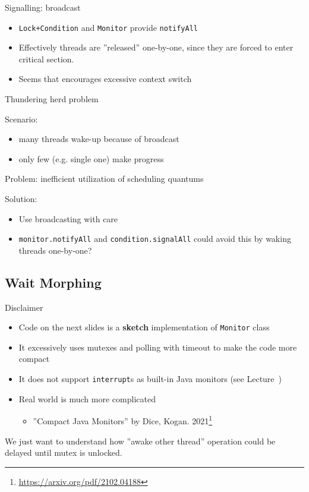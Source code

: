 \begin{frame}[t,noframenumbering]{Signalling: broadcast}

\begin{itemize}
    \item \texttt{Lock+Condition} and \texttt{Monitor} provide \texttt{notifyAll}
    \item Effectively threads are ''released'' one-by-one, since they are forced to enter critical section.    
    \pause \item Seems that encourages excessive context switch
\end{itemize}
\end{frame}

\begin{frame}[fragile]{Thundering herd problem}

    Scenario:
    \begin{itemize}
        \item many threads wake-up because of broadcast 
        \item only few (e.g. single one) make progress
    \end{itemize}

    \pause
    Problem: inefficient utilization of scheduling quantums

    \pause

    Solution:
    \begin{itemize}
        \item Use broadcasting with care
        \pause \item \texttt{monitor.notifyAll} and \texttt{condition.signalAll} could avoid this by waking threads one-by-one?
    \end{itemize}
\end{frame}

\subsection{Wait Morphing}
\showTOCSub

\begin{frame}[t,fragile]{Disclaimer}

\begin{itemize}
    \item Code on the next slides is a \textbf{sketch} implementation of \texttt{Monitor} class
    \item It excessively uses mutexes and polling with timeout to make the code more compact
    \item It does not support \texttt{interrupt}s as built-in Java monitors (see Lecture~\patternsNum)
    \item Real world is much more complicated
    \begin{itemize}
        \item ''Compact Java Monitors'' by Dice, Kogan. 2021\footnote{\tiny\url{https://arxiv.org/pdf/2102.04188}}
    \end{itemize}
\end{itemize}

We just want to understand how ''awake other thread'' operation could be delayed until mutex is unlocked.

\end{frame}


